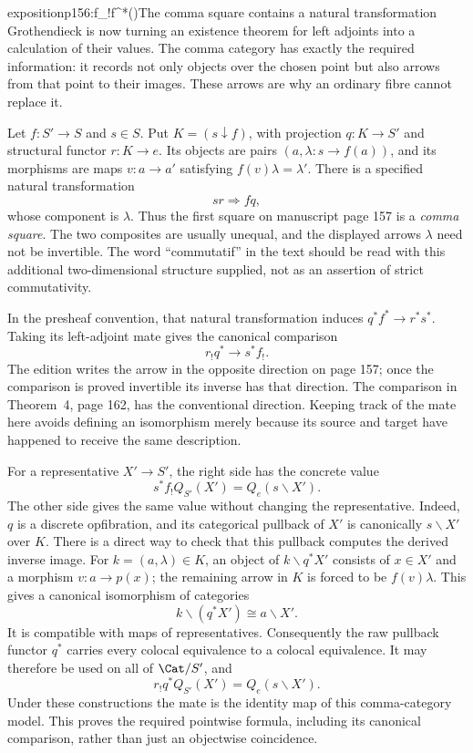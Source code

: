 \begin{dcomment}{exposition}{p156:f_!f^*(\xi)\simeq\hot}{The comma square contains a natural transformation}
Grothendieck is now turning an existence theorem for left adjoints into a calculation of their values. The comma category has exactly the required information: it records not only objects over the chosen point but also arrows from that point to their images. These arrows are why an ordinary fibre cannot replace it.

Let $f:S'\to S$ and $s\in S$. Put $K=(s\downarrow f)$, with projection $q:K\to S'$ and structural functor $r:K\to e$. Its objects are pairs $(a,\lambda:s\to f(a))$, and its morphisms are maps $v:a\to a'$ satisfying $f(v)\lambda=\lambda'$. There is a specified natural transformation
\[
 sr\Longrightarrow fq,
\]
whose component is $\lambda$. Thus the first square on manuscript page 157 is a \emph{comma square}. The two composites are usually unequal, and the displayed arrows $\lambda$ need not be invertible. The word ``commutatif'' in the text should be read with this additional two-dimensional structure supplied, not as an assertion of strict commutativity.

In the presheaf convention, that natural transformation induces $q^*f^*\to r^*s^*$. Taking its left-adjoint mate gives the canonical comparison
\[
 r_!q^*\longrightarrow s^*f_!.
\]
The edition writes the arrow in the opposite direction on page 157; once the comparison is proved invertible its inverse has that direction. The comparison in Theorem~4, page 162, has the conventional direction. Keeping track of the mate here avoids defining an isomorphism merely because its source and target have happened to receive the same description.

For a representative $X'\to S'$, the right side has the concrete value
\[
 s^*f_!Q_{S'}(X')=Q_e(s\backslash X').
\]
The other side gives the same value without changing the representative. Indeed, $q$ is a discrete opfibration, and its categorical pullback of $X'$ is canonically $s\backslash X'$ over $K$. There is a direct way to check that this pullback computes the derived inverse image. For $k=(a,\lambda)\in K$, an object of $k\backslash q^*X'$ consists of $x\in X'$ and a morphism $v:a\to p(x)$; the remaining arrow in $K$ is forced to be $f(v)\lambda$. This gives a canonical isomorphism of categories
\[
 k\backslash(q^*X')\cong a\backslash X'.
\]
It is compatible with maps of representatives. Consequently the raw pullback functor $q^*$ carries every colocal equivalence to a colocal equivalence. It may therefore be used on all of $\Cat/S'$, and
\[
 r_!q^*Q_{S'}(X')=Q_e(s\backslash X').
\]
Under these constructions the mate is the identity map of this comma-category model. This proves the required pointwise formula, including its canonical comparison, rather than just an objectwise coincidence.


\end{dcomment}
